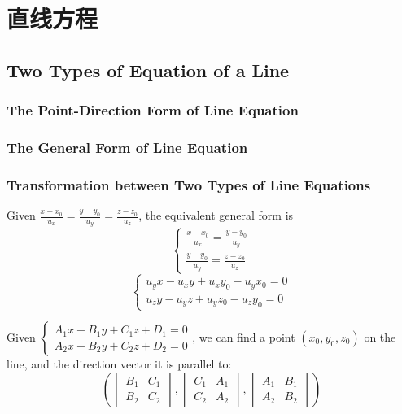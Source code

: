 \documentclass[onecolumn]{ctexart}
\begin{document}
\section{直线方程}

\subsection{Two Types of Equation of a Line}

\subsubsection{The Point-Direction Form of Line Equation}

\subsubsection{The General Form of Line Equation}

\subsubsection{Transformation between Two Types of Line Equations}

Given $\frac{x - x_0}{u_x} = \frac{y - y_0}{u_y} = \frac{z - z_0}{u_z}$, 
the equivalent general form is
\[
  \begin{cases}
    \frac{x - x_0}{u_x} = \frac{y - y_0}{u_y} \\
    \frac{y - y_0}{u_y} = \frac{z - z_0}{u_z}
  \end{cases}
\]
\begin{equation}
  \begin{cases}
    u_y x - u_x y + u_x y_0 - u_y x_0 = 0 \\
    u_z y - u_y z + u_y z_0 - u_z y_0 = 0
  \end{cases} 
\end{equation}

Given $\begin{cases}
  A_1 x + B_1 y + C_1 z + D_1 = 0 \\
  A_2 x + B_2 y + C_2 z + D_2 = 0
\end{cases}$, we can find a point $(x_0, y_0, z_0)$ on the line, and the 
direction vector it is parallel to:
\begin{equation}
  (
  \begin{vmatrix}
    B_1 & C_1 \\
    B_2 & C_2
  \end{vmatrix},
  \begin{vmatrix}
    C_1 & A_1 \\
    C_2 & A_2
  \end{vmatrix},
  \begin{vmatrix}
    A_1 & B_1 \\
    A_2 & B_2
  \end{vmatrix})
\end{equation}
\end{document}

